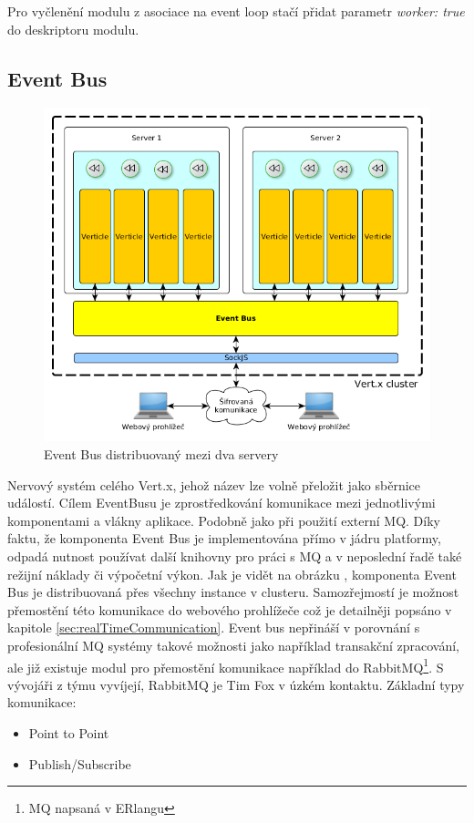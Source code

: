 Pro vyčlenění modulu z asociace na event loop stačí přidat parametr \emph{worker: true} do deskriptoru modulu.

\subsection{Event Bus}\label{sub:eventBus}

\begin{figure}[h]
\begin{centering}
\includegraphics[scale=0.5]{obrazky/2instance4_eventbus}
\par\end{centering}
\caption{Event Bus distribuovaný mezi dva servery}
\label{fig:2instance4_eventbus}
\end{figure}

Nervový systém celého Vert.x, jehož název lze volně přeložit jako sběrnice událostí. Cílem EventBusu je zprostředkování komunikace mezi jednotlivými komponentami a vlákny aplikace. Podobně jako při použití externí MQ. Díky faktu, že komponenta Event Bus je implementována přímo v jádru platformy, odpadá nutnost používat další knihovny pro práci s MQ a v neposlední řadě také režijní náklady či výpočetní výkon. Jak je vidět na obrázku , komponenta Event Bus je distribuovaná přes všechny instance v clusteru. Samozřejmostí je možnost přemostění této komunikace do webového prohlížeče což je detailněji popsáno v kapitole \ref{sec:realTimeCommunication}. Event bus nepřináší v porovnání s profesionální MQ systémy takové možnosti jako například transakční zpracování, ale již existuje modul pro přemostění komunikace například do RabbitMQ\footnote{MQ napsaná v ERlangu}. S vývojáři z týmu vyvíjejí, RabbitMQ je Tim Fox v úzkém kontaktu\cite{vertxNodejs}. Základní typy komunikace:
\begin{itemize}
\item{Point to Point}
\item{Publish/Subscribe}
\end{itemize}

